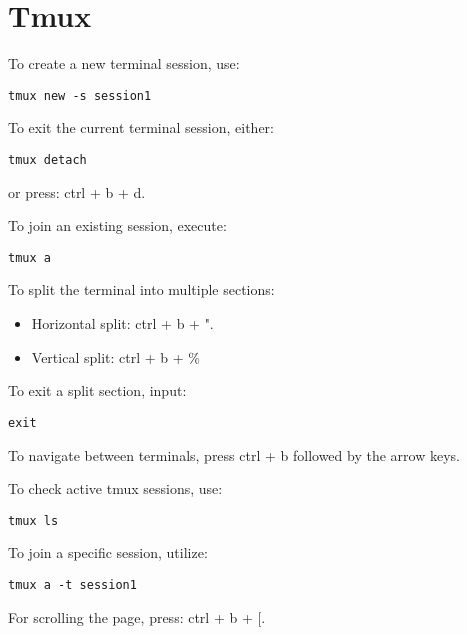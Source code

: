 \section{Tmux}

To create a new terminal session, use:
\begin{verbatim}
tmux new -s session1
\end{verbatim}

To exit the current terminal session, either:
\begin{verbatim}
tmux detach
\end{verbatim}
or press: ctrl + b + d.

To join an existing session, execute:
\begin{verbatim}
tmux a
\end{verbatim}

To split the terminal into multiple sections:
\begin{itemize}
    \item Horizontal split: ctrl + b + ".
    \item Vertical split: ctrl + b + \%
\end{itemize}
To exit a split section, input:
\begin{verbatim}
exit
\end{verbatim}
To navigate between terminals, press ctrl + b followed by the arrow keys.

To check active tmux sessions, use:
\begin{verbatim}
tmux ls
\end{verbatim}
To join a specific session, utilize:
\begin{verbatim}
tmux a -t session1
\end{verbatim}

For scrolling the page, press: ctrl + b + [.